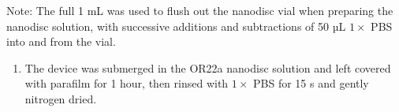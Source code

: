 \documentclass[
  a4paper,
]{scrbook}
\providecommand{\tightlist}{%
  \setlength{\itemsep}{0pt}\setlength{\parskip}{0pt}}\usepackage{longtable,booktabs,array}
\begin{document}
Note: The full 1 mL was used to flush out the nanodisc vial when
preparing the nanodisc solution, with successive additions and
subtractions of 50 µL \(1 \times\) PBS into and from the vial.

\begin{enumerate}
\def\labelenumi{\arabic{enumi}.}
\setcounter{enumi}{6}
\tightlist
\item
  The device was submerged in the OR22a nanodisc solution and left
  covered with parafilm for 1 hour, then rinsed with \(1 \times\) PBS
  for 15 s and gently nitrogen dried.
\end{enumerate}

\begin{figure}

\begin{minipage}[t]{0.03\linewidth}

{\centering 


}

\end{minipage}%
%
\begin{minipage}[t]{0.01\linewidth}

{\centering 

~

}

\end{minipage}%
%
\begin{minipage}[t]{0.45\linewidth}

{\centering 

\raisebox{-\height}{

}}
\end{minipage}
\end{figure}
\end{document}
